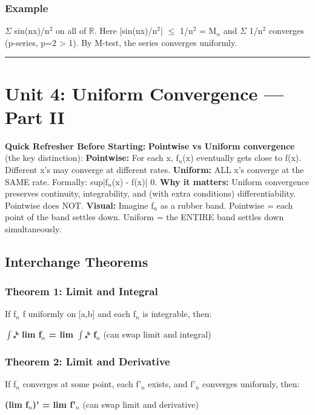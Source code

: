 \documentclass[12pt,a4paper,openany]{book}
\begin{document}
{{\subsubsection{Example}
$\Sigma$ sin(nx)/n$^2$ on all of $\mathbb{R}$. Here |sin(nx)/n$^2$| $\leq$ 1/n$^2$ = M$_n$ and $\Sigma$ 1/n$^2$ converges (p-series, p=2 > 1).
By M-test, the series converges uniformly. 

\bigskip\noindent\rule{\textwidth}{0.4pt}\bigskip

\section{Unit 4: Uniform Convergence — Part II}

\begin{prereqbox}
 \textbf{Quick Refresher Before Starting:}
\textbf{Pointwise vs Uniform convergence} (the key distinction):
\textbf{Pointwise:} For each x, f$_n$(x) eventually gets close to f(x). Different x's may converge at different rates.
\textbf{Uniform:} ALL x's converge at the SAME rate. Formally: sup|f$_n$(x) - f(x)|  0.
\textbf{Why it matters:} Uniform convergence preserves continuity, integrability, and (with extra conditions) differentiability. Pointwise does NOT.
\textbf{Visual:} Imagine f$_n$ as a rubber band. Pointwise = each point of the band settles down. Uniform = the ENTIRE band settles down simultaneously.
\end{prereqbox}


\subsection{Interchange Theorems }

\subsubsection{Theorem 1: Limit and Integral}
If f$_n$  f uniformly on [a,b] and each f$_n$ is integrable, then:

\textbf{$\int$ₐᵇ lim f$_n$ = lim $\int$ₐᵇ f$_n$} (can swap limit and integral)

\subsubsection{Theorem 2: Limit and Derivative}
If {f$_n$} converges at some point, each f'$_n$ exists, and {f'$_n$} converges uniformly, then:

\textbf{(lim f$_n$)' = lim f'$_n$} (can swap limit and derivative)

}}
\end{document}
